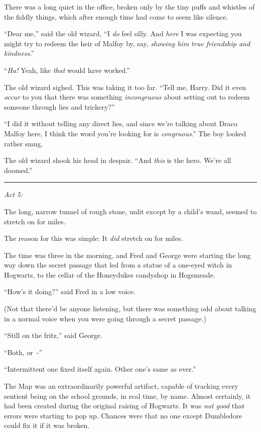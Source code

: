 There was a long quiet in the office, broken only by the tiny puffs and whistles of the fiddly things, which after enough time had come to seem like silence.

``Dear me,'' said the old wizard, ``I \emph{do} feel silly. And \emph{here} I was expecting you might try to redeem the heir of Malfoy by, say, \emph{showing him true friendship and kindness}.''

``\emph{Ha!} Yeah, like \emph{that} would have worked.''

The old wizard sighed. This was taking it too far. ``Tell me, Harry. Did it even \emph{occur} to you that there was something \emph{incongruous} about setting out to redeem someone through lies and trickery?''

``I did it without telling any direct lies, and since we're talking about Draco Malfoy here, I think the word you're looking for is \emph{congruous}.'' The boy looked rather smug.

The old wizard shook his head in despair. ``And \emph{this} is the hero. We're all doomed.''

\begin{center}\rule{3in}{0.4pt}\end{center}

\emph{Act 5:}

The long, narrow tunnel of rough stone, unlit except by a child's wand, seemed to stretch on for miles.

The reason for this was simple: It \emph{did} stretch on for miles.

The time was three in the morning, and Fred and George were starting the long way down the secret passage that led from a statue of a one-eyed witch in Hogwarts, to the cellar of the Honeydukes candyshop in Hogsmeade.

``How's it doing?'' said Fred in a low voice.

(Not that there'd be anyone listening, but there was something odd about talking in a normal voice when you were going through a secret passage.)

``Still on the fritz,'' said George.

``Both, or~-''

``Intermittent one fixed itself again. Other one's same as ever.''

The Map was an extraordinarily powerful artifact, capable of tracking every sentient being on the school grounds, in real time, by name. Almost certainly, it had been created during the original raising of Hogwarts. It was \emph{not good} that errors were starting to pop up. Chances were that no one except Dumbledore could fix it if it was broken.

